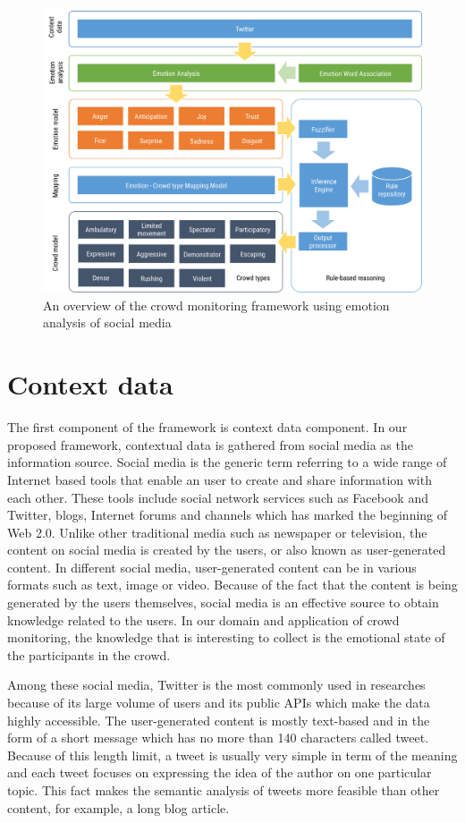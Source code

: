 \begin{figure}[htbp!] 
\centering    
\includegraphics[width=1.0\textwidth]{FrameworkOverview}
\caption{An overview of the crowd monitoring framework using emotion analysis of social media}
\label{fig:frameworkOverview}
\end{figure}

\section{Context data}
The first component of the framework is context data component. In our proposed framework, contextual data is gathered from social media as the information source. Social media is the generic term referring to a wide range of Internet based tools that enable an user to create and share information with each other. These tools include social network services such as Facebook and Twitter, blogs, Internet forums and channels which has marked the beginning of Web 2.0. Unlike other traditional media such as newspaper or television, the content on social media is created by the users, or also known as user-generated content. In different social media, user-generated content can be in various formats such as text, image or video. Because of the fact that the content is being generated by the users themselves, social media is an effective source to obtain knowledge related to the users. In our domain and application of crowd monitoring, the knowledge that is interesting to collect is the emotional state of the participants in the crowd.

Among these social media, Twitter is the most commonly used in researches because of its large volume of users and its public APIs which make the data highly accessible. The user-generated content is mostly text-based and in the form of a short message which has no more than 140 characters called tweet. Because of this length limit, a tweet is usually very simple in term of the meaning and each tweet focuses on expressing the idea of the author on one particular topic. This fact makes the semantic analysis of tweets more feasible than other content, for example, a long blog article.

